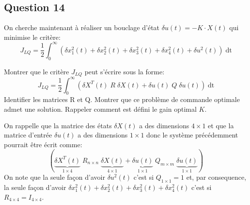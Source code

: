\documentclass[class=article, crop=false]{standalone}
\begin{document}
\subsection{Question 14}
On cherche maintenant à réaliser un bouclage d'état $\delta u(t) = -K \cdot X(t)$ qui minimise le critère:
\begin{equation}
    J_{LQ} = \frac{1}{2} \int^{\infty}_{0}
    ( \delta x^2_1(t) + \delta x^2_2(t) + \delta x^2_3(t) + \delta x^2_4(t) + \delta u^2(t)) \; \text{dt}
\end{equation}
\begin{exercise}
    Montrer que le critère $J_{LQ}$ peut s'écrire sous la forme:
    \begin{equation}
        J_{LQ} = \frac{1}{2} \int^{\infty}_{0}
        ( \delta X^T(t) \; R \; \delta X(t) + \delta u(t) \; Q \; \delta u(t)) \; \text{dt}
    \end{equation}
    Identifier les matrices R et Q. Montrer que ce problème de commande optimale admet une solution. Rappeler comment est défini le gain optimal $K$.
\end{exercise}
\begin{resolution}
    On rappelle que la matrice des états $\delta X(t)$ a des dimensions $4\times 1$ et que la matrice d'entrée $\delta u(t)$ a des dimensions $1\times 1$ donc le système précédemment pourrait être écrit comme:
    \begin{equation*}
        ( 
            \underbrace{\delta X^T(t)}_{1\times 4}
            \; 
            {R}_{n\times n}
            \;
            \underbrace{\delta X(t)}_{4\times 1}
            + 
            \underbrace{\delta u(t)}_{1\times 1}
            \;
            {Q}_{m\times m}
            \;
            \underbrace{\delta u(t)}_{1\times 1}
        )
    \end{equation*}
    On note que la seule façon d'avoir $\delta u^2(t)$ c'est si $Q_{1\times 1} = 1$ et, par consequence, la seule façon d'avoir $\delta x^2_1(t) + \delta x^2_2(t) + \delta x^2_3(t) + \delta x^2_4(t)$ c'est si $R_{4\times 4} = I_{4\times 4}$.
\end{resolution}

\newpage
\end{document}
